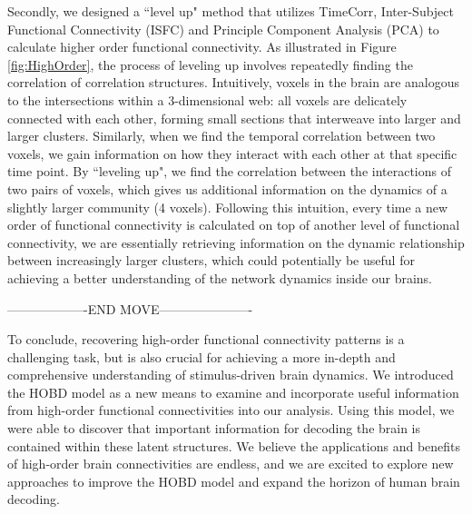 \documentclass[11pt]{article}
\begin{document}
Secondly, we designed a ``level up" method that utilizes TimeCorr, Inter-Subject Functional Connectivity (ISFC) and Principle Component Analysis (PCA) to calculate higher order functional connectivity. As illustrated in Figure \ref{fig:HighOrder}, the process of leveling up involves repeatedly finding the correlation of correlation structures. Intuitively, voxels in the brain are analogous to the intersections within a 3-dimensional web: all voxels are delicately connected with each other, forming small sections that interweave into larger and larger clusters. Similarly, when we find the temporal correlation between two voxels, we gain information on how they interact with each other at that specific time point. By ``leveling up", we find the correlation between the interactions of two pairs of voxels, which gives us additional information on the dynamics of a slightly larger community (4 voxels). Following this intuition, every time a new order of functional connectivity is calculated on top of another level of functional connectivity, we are essentially retrieving information on the dynamic relationship between increasingly larger clusters, which could potentially be useful for achieving a better understanding of the network dynamics inside our brains.

-------------------END MOVE----------------------

To conclude, recovering high-order functional connectivity patterns is a challenging task, but is also crucial for achieving a more in-depth and comprehensive understanding of stimulus-driven brain dynamics. We introduced the HOBD model as a new means to examine and incorporate useful information from high-order functional connectivities into our analysis. Using this model, we were able to discover that important information for decoding the brain is contained within these latent structures. We believe the applications and benefits of high-order brain connectivities are endless, and we are excited to explore new approaches to improve the HOBD model and expand the horizon of human brain decoding.

\newpage


\end{document}
